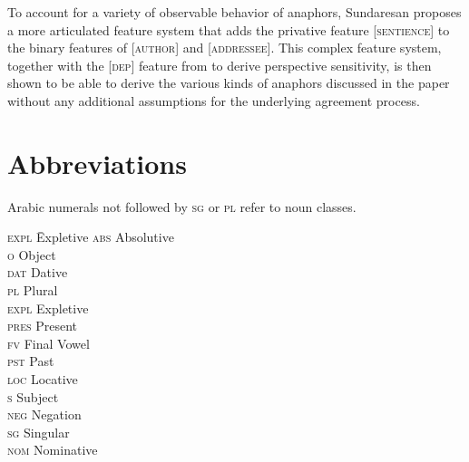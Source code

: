 \documentclass[output=paper
,modfonts
,nonflat]{langsci/langscibook}
\begin{document}
To account for a variety of observable behavior of anaphors, Sundaresan proposes a more articulated feature system that adds the privative feature [\textsc{sentience}] to the binary features of [\textsc{author}] and [\textsc{addressee}]. This complex feature system, together with the [\textsc{dep}] feature from \citet{sundaresan2012} to derive perspective sensitivity, is then shown to be able to derive the various kinds of anaphors discussed in the paper without any additional assumptions for the underlying agreement process.

\newpage
\section*{Abbreviations}

Arabic numerals not followed by \textsc{sg} or \textsc{pl} refer to noun classes.

\begin{multicols}{2}
	\begin{tabbing}
\textsc{expl}\hspace{5mm} \= Expletive\kill
		\textsc{abs} 	\> Absolutive \\		 	\textsc{o} \> Object 	\\
		\textsc{dat} 	\> Dative	\\		 \textsc{pl} \> Plural	\\
		\textsc{expl} 	\> Expletive \\		 \textsc{pres} \> Present	\\
		\textsc{fv} 	\> Final Vowel	\\ 	 \textsc{pst} \> Past	\\
		\textsc{loc} 	\> Locative \\			 \textsc{s} \> Subject	\\
		\textsc{neg} 	\> Negation \\			 \textsc{sg} \> Singular\\
		\textsc{nom} 	\> Nominative 	\\	
\end{tabbing}
\end{multicols}

\printbibliography[heading=subbibliography,notkeyword=this]
\end{document}

